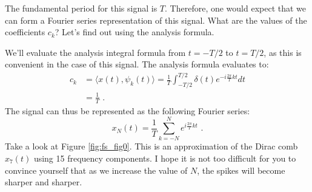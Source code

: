 The fundamental period for this signal is $T$. Therefore, one would expect that we can form a Fourier series representation of this signal. What are the values of the coefficients $c_k$? Let's find out using the analysis formula.

We'll evaluate the analysis integral formula from $t=-T/2$ to $t=T/2$, as this is convenient in the case of this signal. The analysis formula evaluates to:
\begin{align}
c_k &= \langle x(t),\psi_k(t) \rangle = \frac{1}{T} \int_{-T/2}^{T/2} \delta(t) e^{-i\frac{2\pi}{T}kt} dt \\
&= \frac{1}{T}\label{eq:dirac_comb_coeff} \,\,.
\end{align}
The signal can thus be represented as the following Fourier series:
\begin{equation}
x_N(t) = \frac{1}{T}\sum_{k=-N}^{N} e^{i\frac{2\pi}{T}kt} \,\,. 
\end{equation}
Take a look at Figure \ref{fig:fs_fig0}. This is an approximation of the Dirac comb $x_7(t)$ using 15 frequency components. I hope it is not too difficult for you to convince yourself that as we increase the value of $N$, the spikes will become sharper and sharper.

